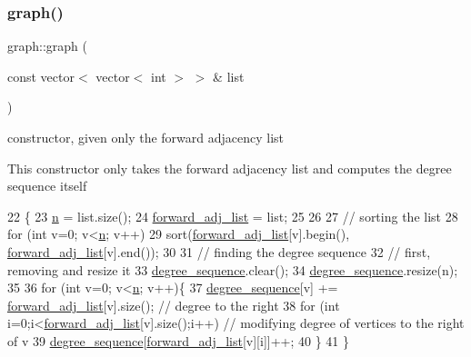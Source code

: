 \subsubsection{\texorpdfstring{graph()}{graph()}\hspace{0.1cm}{\footnotesize\ttfamily [3/3]}}
{\footnotesize\ttfamily graph\+::graph (\begin{DoxyParamCaption}\item[{const vector$<$ vector$<$ int $>$ $>$ \&}]{list }\end{DoxyParamCaption})}



constructor, given only the forward adjacency list 

This constructor only takes the forward adjacency list and computes the degree sequence itself 
\begin{DoxyCode}
22 \{
23   \hyperlink{classgraph_ac8b3474ce95c04087c312508ec1443b6}{n} = list.size();
24   \hyperlink{classgraph_a7d6441850d586d6a99fb73df57b70362}{forward\_adj\_list} = list;
25 
26 
27   \textcolor{comment}{// sorting the list}
28   \textcolor{keywordflow}{for} (\textcolor{keywordtype}{int} v=0; v<\hyperlink{classgraph_ac8b3474ce95c04087c312508ec1443b6}{n}; v++)
29     sort(\hyperlink{classgraph_a7d6441850d586d6a99fb73df57b70362}{forward\_adj\_list}[v].begin(), \hyperlink{classgraph_a7d6441850d586d6a99fb73df57b70362}{forward\_adj\_list}[v].end());
30 
31   \textcolor{comment}{// finding the degree sequence}
32   \textcolor{comment}{// first, removing and resize it}
33   \hyperlink{classgraph_a0b31295672bfe37669c9eb3640977fe6}{degree\_sequence}.clear();
34   \hyperlink{classgraph_a0b31295672bfe37669c9eb3640977fe6}{degree\_sequence}.resize(n);
35 
36   \textcolor{keywordflow}{for} (\textcolor{keywordtype}{int} v=0; v<\hyperlink{classgraph_ac8b3474ce95c04087c312508ec1443b6}{n}; v++)\{
37     \hyperlink{classgraph_a0b31295672bfe37669c9eb3640977fe6}{degree\_sequence}[v] += \hyperlink{classgraph_a7d6441850d586d6a99fb73df57b70362}{forward\_adj\_list}[v].size(); \textcolor{comment}{// degree to the right
       }
38     \textcolor{keywordflow}{for} (\textcolor{keywordtype}{int} i=0;i<\hyperlink{classgraph_a7d6441850d586d6a99fb73df57b70362}{forward\_adj\_list}[v].size();i++) \textcolor{comment}{// modifying degree of vertices to the
       right of v}
39       \hyperlink{classgraph_a0b31295672bfe37669c9eb3640977fe6}{degree\_sequence}[\hyperlink{classgraph_a7d6441850d586d6a99fb73df57b70362}{forward\_adj\_list}[v][i]]++;
40   \}
41 \}
\end{DoxyCode}


